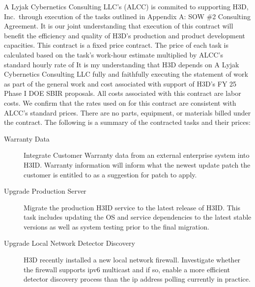 \documentclass[8pt, letterpaper]{awesome-cv} %
\begin{document}
\makecvheader %

\makelettertitle %


\begin{cvletter}
  A Lyjak Cybernetics Consulting LLC's (ALCC) is commited to supporting H3D, Inc.\ through execution
  of the tasks outlined in Appendix A: SOW \#2 Consulting Agreement. It is our joint understanding
  that execution of this contract will benefit the efficiency and quality of H3D's production and
  product development capacities. This contract is a fixed price contract. The price of each task is
  calculated based on the task's work-hour estimate multiplied by ALCC's standard hourly rate of
   It is my understanding that H3D depends on A Lyjak Cybernetics
  Consulting LLC fully and faithfully executing the statement of work as part of the general work
  and cost associated with support of H3D's FY 25 Phase I DOE SBIR proposals. All costs associated
  with this contract are labor costs. We confirm that the rates used on for this contract are
  consistent with ALCC's standard prices. There are no parts, equipment, or materials billed under
  the contract. The following is a summary of the contracted tasks and their prices:

  \begin{description}
    \item[Warranty Data] Integrate Customer Warranty data from an external enterprise system into
      H3ID. Warranty information will inform what the newest update patch the customer is entitled
      to as a suggestion for patch to apply. 

    \item[Upgrade Production Server] Migrate the production H3ID service to the latest release of
      H3ID. This task includes updating the OS and service dependencies to the latest stable
      versions as well as system testing prior to the final migration. 

    \item[Upgrade Local Network Detector Discovery] H3D recently installed a new local network
      firewall. Investigate whether the firewall supports ipv6 multicast and if so, enable a more
      efficient detector discovery process than the ip address polling currently in
      practice. 


\end{description}
\end{cvletter}
\end{document}
